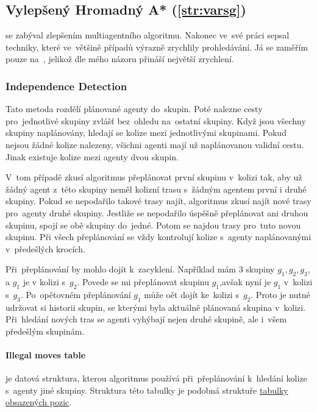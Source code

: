\subsection{Vylepšený Hromadný A* (\ref{str:varsg})}\label{subsec:vylepseny_hromadny_a_star}

\citeauthor{Standley_2010} se zabýval zlepšením multiagentního  algoritmu.
Nakonec ve~své práci \citet*{Standley_2010} sepsal techniky, které ve~většině případů výrazně zrychlily prohledávání.
Já se zaměřím pouze na~,
jelikož dle mého názoru přináší největší zrychlení.

\subsubsection{Independence Detection}\label{subsubsec:varsg_independence_detection}

Tato metoda rozdělí plánované agenty do~skupin.
Poté nalezne cesty pro~jednotlivé skupiny zvlášť bez~ohledu na~ostatní skupiny.
Když jsou všechny skupiny naplánovány, hledají se kolize mezi jednotlivými skupinami.
Pokud nejsou žádné kolize nalezeny, všichni agenti mají už naplánovanou validní cestu.
Jinak existuje kolize mezi agenty dvou skupin.

V~tom případě zkusí algoritmus přeplánovat první skupinu v~kolizi tak,
aby už žádný agent z~této skupiny neměl kolizní trasu s~žádným agentem první i druhé skupiny.
Pokud se nepodařilo takové trasy najít, algoritmus zkusí najít nové trasy pro~agenty druhé skupiny.
Jestliže se nepodařilo úspěšně přeplánovat ani druhou skupinu, spojí se obě skupiny do~jedné.
Potom se najdou trasy pro~tuto novou skupinu.
Při všech přeplánování se vždy kontrolují kolize s~agenty naplánovanými v~předešlých krocích.

Při~přeplánování by mohlo dojít k~zacyklení.
Například mám $3$ skupiny $g_1, g_2, g_3$, a $g_1$ je v kolizi s~$g_2$.
Povede se mi přeplánovat skupinu $g_1$,avšak nyní je $g_1$ v~kolizi s~$g_3$.
Po~opětovném přeplánování $g_1$ může oět dojít ke~kolizi s~$g_2$.
Proto je nutné udržovat si historii skupin, se kterými byla aktuálně plánovaná skupina v~kolizi.
Při~hledání nových tras se agenti vyhýbají nejen druhé skupině, ale i~všem předešlým skupinám.

\paragraph{Illegal moves table}\label{par:varsg_illegal_moves_table} je datová struktura,
kterou algoritmus používá při~přeplánování k~hledání kolize s~agenty jiné skupiny.
Struktura této tabulky je podobná struktuře \hyperref[par:obsazene_pozice]{tabulky obsazených pozic}.

